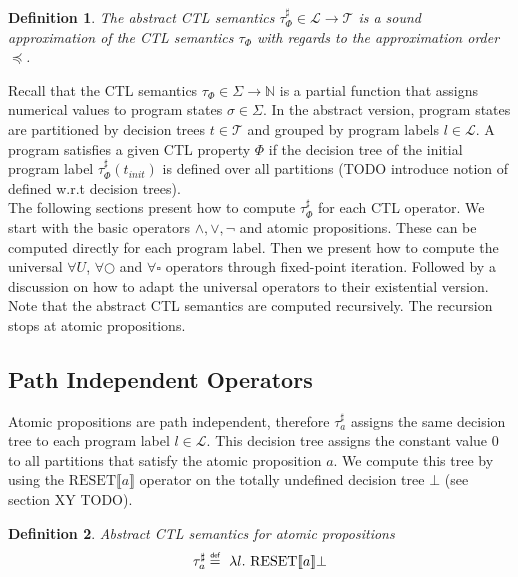 \documentclass[11pt,a4paper,titlepage]{article}
\newtheorem{definition}{Definition}[section]
\newcommand\eqdef{\mathrel{\overset{\makebox[0pt]{\mbox{\normalfont\tiny\sffamily def}}}{=}}}
\begin{document}
\begin{definition}
    The abstract CTL semantics $\tau^{\sharp}_\Phi \in \mathcal{L} \rightarrow \mathcal{T}$ is a sound approximation of the
    CTL semantics $\tau_\Phi$ with regards to the \textit{approximation order} $\preceq$.
\end{definition}

Recall that the CTL semantics $\tau_\Phi \in \Sigma \rightarrow \mathbb{N}$ is a partial function that 
assigns numerical values to program states $\sigma \in \Sigma$. 
In the abstract version, program states are partitioned by decision trees $t \in \mathcal{T}$ and 
grouped by program labels $l \in \mathcal{L}$. A program satisfies a given CTL property $\Phi$ if the decision tree of the
initial program label $\tau^{\sharp}_\Phi(t_{init})$ is defined over all partitions 
(TODO introduce notion of defined w.r.t decision trees).
\\

The following sections present how to compute $\tau^{\sharp}_\Phi$ for each CTL operator. 
We start with the basic operators $\land, \lor, \neg$ and atomic propositions. 
These can be computed directly for each program label. 
Then we present how to compute the universal $\forall U$, $\forall\bigcirc$ and $\forall\square$ operators through fixed-point iteration. 
Followed by a discussion on how to adapt the universal operators to their existential version. 
Note that the abstract CTL semantics are computed recursively. The recursion stops at atomic propositions.

\subsection{Path Independent Operators}

Atomic propositions are path independent, therefore $\tau^{\sharp}_a$ assigns the same decision tree to 
each program label $l \in \mathcal{L}$. This decision tree assigns the constant value $0$ to all partitions that satisfy the atomic proposition $a$.
We compute this tree by using the $\text{RESET} \llbracket a \rrbracket$ operator on the totally undefined decision tree $\bot$ (see section XY TODO). 

\begin{definition}\label{def:abstract_ctl_semantics_atomic}
    Abstract CTL semantics for atomic propositions
    \begin{align}
        \tau^{\sharp}_{a} \eqdef \ \lambda l. \ \text{RESET} \llbracket a \rrbracket \bot
    \end{align}
\end{definition}
\end{document}
